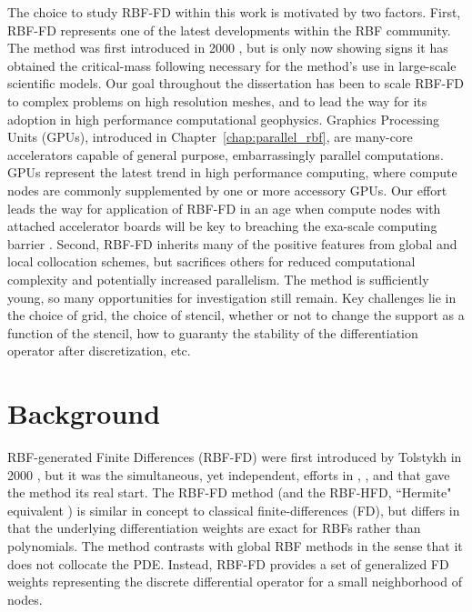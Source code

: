 \documentclass[11pt]{report}
\begin{document}
{The choice to study RBF-FD within this work is motivated by two factors. First, RBF-FD represents one of the latest developments within the RBF community. The method was first introduced in 2000 \cite{Tolstykh2000}, but is only now showing signs it has obtained the critical-mass following necessary for the method's use in large-scale scientific models. Our goal throughout the dissertation has been to scale RBF-FD to complex problems on high resolution meshes, and to lead the way for its adoption in high performance computational geophysics. Graphics Processing Units (GPUs), introduced in Chapter~\ref{chap:parallel_rbf}, are many-core accelerators capable of general purpose, embarrassingly parallel computations. GPUs represent the latest trend in high performance computing, where compute nodes are commonly supplemented by one or more accessory GPUs. %
Our effort leads the way for application of RBF-FD in an age when compute nodes with attached accelerator boards will be key to breaching the exa-scale computing barrier \cite{GPUandExascale2011}. Second, RBF-FD inherits many of the positive features from global and local collocation schemes, but sacrifices others for reduced computational complexity and potentially increased parallelism. The method is sufficiently young, so many opportunities for investigation still remain. Key challenges lie in the choice of grid, the choice of stencil, whether or not to change the support as a function of the stencil, how to guaranty the stability of the differentiation  operator after discretization, etc. 






\section{Background}

RBF-generated Finite Differences (RBF-FD) were first introduced by Tolstykh in 2000 \cite{Tolstykh2000}, 
but it was the simultaneous, yet independent,
efforts in \cite{Shu2003}, \cite{Tolstykh2003a}, \cite{Wright2003} and \cite{Cecil2004} that gave the method its real start. 
The RBF-FD method (and the RBF-HFD, ``Hermite" equivalent \cite{WrightFornberg06}) is similar in concept to classical 
finite-differences (FD), but differs in that the underlying differentiation 
weights are exact for RBFs rather than polynomials. The method contrasts with global RBF methods in the sense that it does not collocate the PDE. Instead, RBF-FD provides a set of generalized FD weights representing the discrete differential operator for a small neighborhood of nodes.

}
\end{document}
